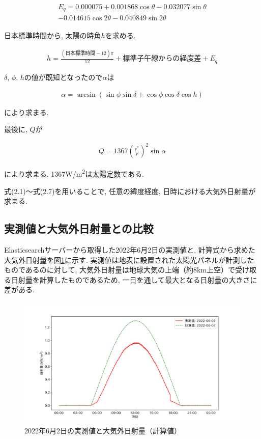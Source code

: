 \begin{eqnarray}
  \begin{split}
    E_q =  0.000075+0.001868\cos \theta-0.032077\sin \theta\\
    -0.014615\cos 2\theta-0.040849\sin 2\theta
  \end{split}
\end{eqnarray}

日本標準時間から, 太陽の時角$h$を求める.

\begin{eqnarray}
  h = \frac{(日本標準時間-12)\pi}{12}+標準子午線からの経度差+E_q
\end{eqnarray}

$\delta$, $\phi$, $h$の値が既知となったので$\alpha$は

\begin{eqnarray}
  \alpha = \arcsin (\sin \phi\sin \delta+\cos \phi\cos \delta\cos h)
\end{eqnarray}

により求まる.

最後に, $Q$が

\begin{eqnarray}
  Q = 1367(\frac{r^{*}}{r})^{2}\sin \alpha
\end{eqnarray}

により求まる. 1367\si{\watt}/\si{\metre\squared}は太陽定数である.

式(2.1)～式(2.7)を用いることで, 任意の緯度経度, 日時における大気外日射量が求まる.


\subsection{実測値と大気外日射量との比較}
Elasticsearchサーバーから取得した2022年6月2日の実測値と, 計算式から求めた大気外日射量を図\ref{20220529-p1}に示す. 実測値は地表に設置された太陽光パネルが計測したものであるのに対して, 大気外日射量は地球大気の上端（約8km上空）で受け取る日射量を計算したものであるため, 一日を通して最大となる日射量の大きさに差がある.

\begin{figure}[H]
  \begin{center}
    \includegraphics[width=160mm]{sotu/figure/2/original-20220602-corr.png}
    \caption{2022年6月2日の実測値と大気外日射量（計算値）}
    \label{20220529-p1}
  \end{center}
\end{figure}

